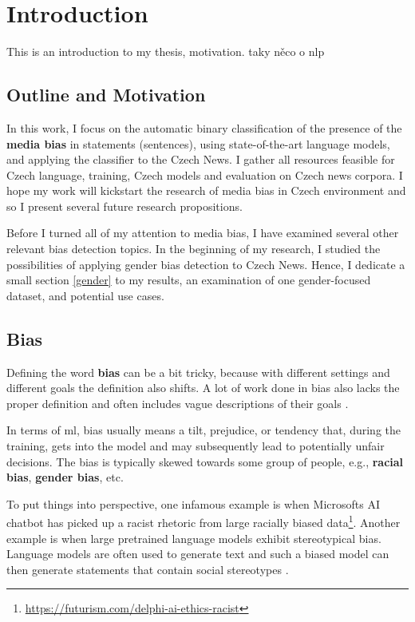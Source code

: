 \chapter{Introduction}
This is an introduction to my thesis, motivation. taky něco o nlp

\section{Outline and Motivation}
In this work, I focus on the automatic binary classification of the presence of the \textbf{media bias} in statements (sentences), using state-of-the-art language models, and applying the classifier to the Czech News. I gather all resources feasible for Czech language, training, Czech models and evaluation on Czech news corpora. I hope my work will kickstart the research of media bias in Czech environment and so I present several future research propositions.

Before I turned all of my attention to media bias, I have examined several other relevant bias detection topics. In the beginning of my research, I studied the possibilities of applying gender bias detection to Czech News. Hence, I dedicate a small section \ref{gender} to my results, an examination of one gender-focused dataset, and potential use cases.


\section{Bias}
Defining the word \textbf{bias} can be a bit tricky, because with different settings and different goals the definition also shifts. A lot of work done in bias also lacks the proper definition and often includes vague descriptions of their goals \cite{blodgett2020language}. 

In terms of \Gls{ml}, bias usually means a tilt, prejudice, or tendency that, during the training, gets into the model and may subsequently lead to potentially unfair decisions. The bias is typically skewed towards some group of people, e.g., \textbf{racial bias}, \textbf{gender bias}, etc. 

To put things into perspective, one infamous example is when Microsofts AI chatbot has picked up a racist rhetoric from large racially biased data\footnote{\url{https://futurism.com/delphi-ai-ethics-racist}}. Another example is when large pretrained language models exhibit stereotypical bias. Language models are often used to generate text and such a biased model can then generate statements that contain social stereotypes \cite{nadeem2021stereoset}.

